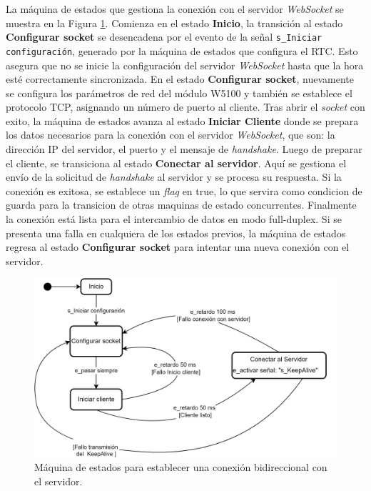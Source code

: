 La máquina de estados que gestiona la conexión con el servidor \textit{WebSocket} se muestra en la Figura \ref{fig:sc_connectionWebSocket}. Comienza en el estado \textbf{Inicio}, la transición al estado \textbf{Configurar socket} se desencadena por el evento de la señal \texttt{s\_Iniciar configuración}, generado por la máquina de estados que configura el RTC. Esto asegura que no se inicie la configuración del servidor \textit{WebSocket} hasta que la hora esté correctamente sincronizada. En el estado \textbf{Configurar socket}, nuevamente se configura  los parámetros de red del módulo W5100 y también se establece el protocolo TCP, asignando un número de puerto al cliente. Tras abrir el \textit{socket} con exito, la máquina de estados avanza al estado \textbf{Iniciar Cliente} donde se prepara los datos necesarios para la conexión con el servidor \textit{WebSocket}, que son: la dirección IP del servidor, el puerto y el mensaje de \textit{handshake}. Luego de preparar el cliente, se transiciona al estado \textbf{Conectar al servidor}. Aquí se gestiona el envío de la solicitud de \textit{handshake} al servidor y se procesa su respuesta. Si la conexión es exitosa, se establece un \textit{flag} en true, lo que servira como condicion de guarda para la transicion de otras maquinas de estado concurrentes. Finalmente la conexión está lista para el intercambio de datos en modo full-duplex. Si se presenta una falla en cualquiera de los estados previos, la máquina de estados regresa al estado \textbf{Configurar socket} para intentar una nueva conexión con el servidor.

\begin{figure}[H]
    \centering
    \includegraphics[width=0.85\linewidth]{Figuras/datalogger/Firmware/sc_connectionWebSocket.png}
    \caption{Máquina de estados para establecer una conexión bidireccional con el servidor.}
    \label{fig:sc_connectionWebSocket}
\end{figure}

